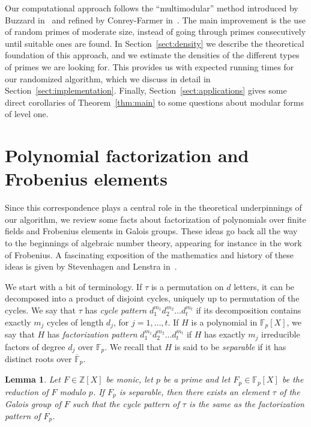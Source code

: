 \documentclass[11pt]{article}
\theoremstyle{plain}
\newtheorem{lemma}[theorem]{Lemma}
\theoremstyle{definition}
\theoremstyle{remark}
\numberwithin{equation}{section}
\newcommand{\ZZ}{\mathbb{Z}}
\newcommand{\FF}{\mathbb{F}}
\begin{document}
Our computational approach follows the ``multimodular'' method introduced by
Buzzard in~\cite{Buzzard} and refined by Conrey-Farmer in~\cite{ConreyFarmer}.
The main improvement is the use of random primes of moderate size, instead of
going through primes consecutively until suitable ones are found.  In
Section~\ref{sect:density} we describe the theoretical foundation of this
approach, and we estimate the densities of the different types of primes we
are looking for.  This provides us with expected running times for our
randomized algorithm, which we discuss in detail in
Section~\ref{sect:implementation}.  Finally, Section~\ref{sect:applications}
gives some direct corollaries of Theorem~\ref{thm:main} to some questions
about modular forms of level one.

\section{Polynomial factorization and Frobenius elements}
\label{sect:frobenius}
Since this correspondence plays a central role in the theoretical
underpinnings of our algorithm, we review some facts about factorization of
polynomials over finite fields and Frobenius elements in Galois groups.  These
ideas go back all the way to the beginnings of algebraic number theory,
appearing for instance in the work of Frobenius.  A fascinating exposition of the
mathematics and history of these ideas is given by Stevenhagen and Lenstra
in~\cite{StevenhagenLenstra}.

We start with a bit of terminology.  If $\tau$ is a permutation on $d$ letters, 
it can be decomposed into a product of disjoint cycles, uniquely up to
permutation of the cycles.  We say that $\tau$ has \emph{cycle pattern}
$d_1^{m_1}d_2^{m_2}\ldots d_t^{m_t}$ if its decomposition contains exactly
$m_j$ cycles of length $d_j$, for $j=1,\ldots,t$.  If $H$ is a polynomial in
$\FF_p[X]$, we say that $H$ has \emph{factorization pattern}
$d_1^{m_1}d_2^{m_2}\ldots d_t^{m_t}$ if $H$ has exactly $m_j$ irreducible
factors of degree $d_j$ over $\FF_p$.  We recall that $H$ is said to be
\emph{separable} if it has distinct roots over $\overline{\FF}_p$.

\begin{lemma}
  \label{lem:frobenius}
  Let $F\in\ZZ[X]$ be monic, let $p$ be a prime and let $F_p\in\FF_p[X]$ be
  the reduction of $F$ modulo $p$.  If $F_p$ is separable, then there exists
  an element $\tau$ of the Galois group of $F$ such that the cycle pattern of
  $\tau$ is the same as the factorization pattern of $F_p$.
\end{lemma}
\end{document}
